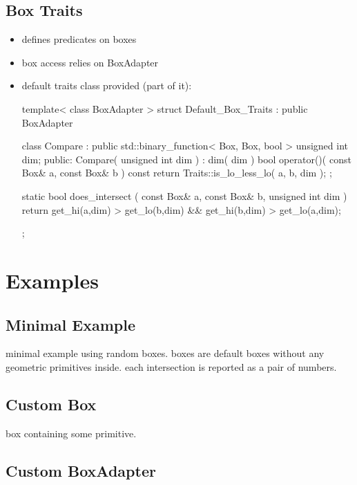 \subsection*{Box Traits}
\begin{itemize}
\item defines predicates on boxes
\item box access relies on BoxAdapter
\item default traits class provided (part of it):
\begin{ccExampleCode}
template< class BoxAdapter >
struct Default_Box_Traits : public BoxAdapter {
    class Compare : public std::binary_function< Box, Box, bool > {
        unsigned int dim;
    public:
        Compare( unsigned int dim ) : dim( dim ) {}
        bool operator()( const Box& a, const Box& b ) const
        { 
             return Traits::is_lo_less_lo( a, b, dim );  
        }
    };

    static bool does_intersect ( const Box& a, const Box& b, unsigned int dim )
    { 
         return get_hi(a,dim) > get_lo(b,dim) && get_hi(b,dim) > get_lo(a,dim); 
    }
};
\end{ccExampleCode}
\end{itemize}
 
\section*{Examples}
\subsection*{Minimal Example}
minimal example using random boxes. boxes are default boxes without any geometric primitives inside. each intersection is reported as a pair of numbers. 

\subsection*{Custom Box}
box containing some primitive.

\subsection*{Custom BoxAdapter }



